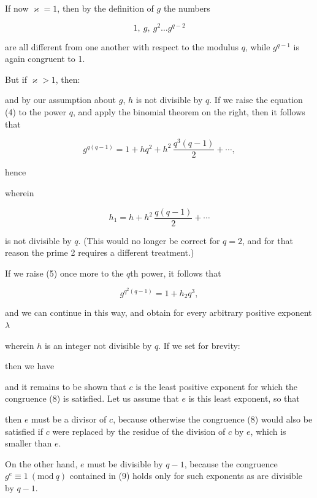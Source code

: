 
If now $\varkappa = 1$, then by the definition of $g$ the numbers

\[
1,\ g,\ g^2 \ldots g^{q-2}
\]

are all different from one another with respect to the modulus $q$, while $g^{q-1}$ is again congruent to 1.

But if $\varkappa > 1$, then:


and by our assumption about $g$, $h$ is not divisible by $q$. If we raise the equation (4) to the power $q$, and apply the binomial theorem on the right, then it follows that

\[
g^{q(q-1)} = 1 + hq^2 + h^2\, \frac{q^3(q-1)}{2} + \cdots,
\]

hence


wherein

\[
h_1 = h + h^2\, \frac{q(q-1)}{2} + \cdots
\]

is not divisible by $q$. (This would no longer be correct for $q = 2$, and for that reason the prime 2 requires a different treatment.)

If we raise (5) once more to the $q$th power, it follows that

\[
g^{q^2(q-1)} = 1 + h_2 q^3,
\]

and we can continue in this way, and obtain for every arbitrary positive exponent $\lambda$


wherein $h$ is an integer not divisible by $q$. If we set for brevity:


then we have


and it remains to be shown that $c$ is the least positive exponent for which the congruence (8) is satisfied. Let us assume that $e$ is this least exponent, so that


then $e$ must be a divisor of $c$, because otherwise the congruence (8) would also be satisfied if $c$ were replaced by the residue of the division of $c$ by $e$, which is smaller than $e$.

On the other hand, $e$ must be divisible by $q-1$, because the congruence $g^e \equiv 1\ (\mathrm{mod}\ q)$ contained in (9) holds only for such exponents as are divisible by $q-1$.
